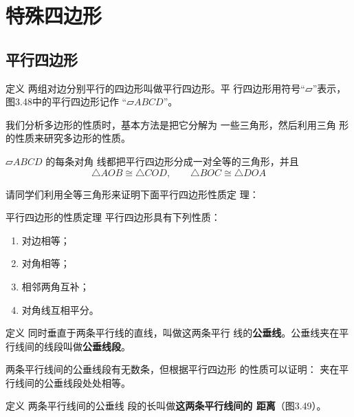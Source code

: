\section{特殊四边形}
\subsection{平行四边形}
\begin{blk}{定义}
两组对边分别平行的四边形叫做平行四边形。平
行四边形用符号“$\parallelogram$”表示，图3.48中的平行四边形记作
“$\parallelogram ABCD$”。
\end{blk}


我们分析多边形的性质时，基本方法是把它分解为
一些三角形，然后利用三角
形的性质来研究多边形的性质。

$\parallelogram ABCD$ 的每条对角
线都把平行四边形分成一对全等的三角形，并且
\[\triangle AOB\cong \triangle COD,\qquad \triangle BOC\cong \triangle DOA\]

请同学们利用全等三角形来证明下面平行四边形性质定
理：

\begin{blk}
    {平行四边形的性质定理}
平行四边形具有下列性质：
\begin{enumerate}
    \item 对边相等；
    \item 对角相等；
    \item 相邻两角互补；
    \item 对角线互相平分。
\end{enumerate}
\end{blk}

\begin{blk}
    {定义} 同时垂直于两条平行线的直线，叫做这两条平行
线的\textbf{公垂线}。公垂线夹在平行线间的线段叫做\textbf{公垂线段}。
\end{blk}

两条平行线间的公垂线段有无数条，但根据平行四边形
的性质可以证明：
夹在平行线间的公垂线段处处相等。


\begin{blk}
    {定义} 两条平行线间的公垂线
段的长叫做\textbf{这两条平行线间的
距离}（图3.49）。
\end{blk}

\begin{figure}[htp]
    \centering
{}
    \caption{}
\end{figure}



